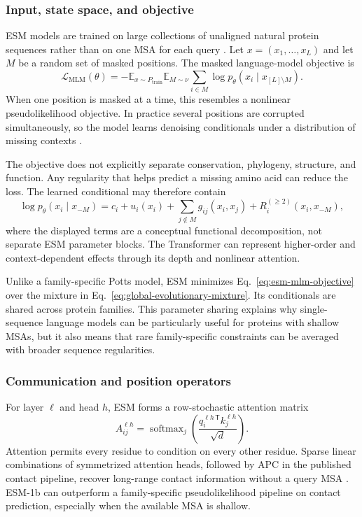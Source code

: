 \documentclass[10pt]{article}
\newcommand{\E}{\mathbb E}
\begin{document}
\subsubsection{Input, state space, and objective}

ESM models are trained on large collections of unaligned natural protein sequences rather than on
one MSA for each query \cite{rives2021}.  Let $x=(x_1,\ldots,x_L)$ and let $M$ be a random set of
masked positions.  The masked language-model objective is
\begin{equation}
\mathcal L_{\mathrm{MLM}}(\theta)
=-\E_{x\sim P_{\mathrm{train}}}
\E_{M\sim\nu}
\sum_{i\in M}
\log p_{\theta}(x_i\mid x_{[L]\setminus M}).
\label{eq:esm-mlm-objective}
\end{equation}
When one position is masked at a time, this resembles a nonlinear pseudolikelihood objective.  In
practice several positions are corrupted simultaneously, so the model learns denoising
conditionals under a distribution of missing contexts \cite{rao2020}.

The objective does not explicitly separate conservation, phylogeny, structure, and function.  Any
regularity that helps predict a missing amino acid can reduce the loss.  The learned conditional
may therefore contain
\begin{equation}
\log p_{\theta}(x_i\mid x_{-M})
=c_i+u_i(x_i)+
\sum_{j\notin M}g_{ij}(x_i,x_j)
+R_i^{(\geq2)}(x_i,x_{-M}),
\label{eq:esm-conditional-decomposition}
\end{equation}
where the displayed terms are a conceptual functional decomposition, not separate ESM parameter
blocks.  The Transformer can represent higher-order and context-dependent effects through its
depth and nonlinear attention.

Unlike a family-specific Potts model, ESM minimizes Eq.~\ref{eq:esm-mlm-objective} over the mixture
in Eq.~\ref{eq:global-evolutionary-mixture}.  Its conditionals are shared across protein families.
This parameter sharing explains why single-sequence language models can be particularly useful for
proteins with shallow MSAs, but it also means that rare family-specific constraints can be averaged
with broader sequence regularities.

\subsubsection{Communication and position operators}

For layer $\ell$ and head $h$, ESM forms a row-stochastic attention matrix
\begin{equation}
A_{ij}^{\ell h}
=\operatorname{softmax}_{j}
\left(
\frac{q_i^{\ell h\,\mathsf T}k_j^{\ell h}}
{\sqrt d}
\right).
\label{eq:esm-attention}
\end{equation}
Attention permits every residue to condition on every other residue.  Sparse linear combinations
of symmetrized attention heads, followed by APC in the published contact pipeline, recover
long-range contact information without a query MSA \cite{rao2020}.  ESM-1b can outperform a
family-specific pseudolikelihood pipeline on contact prediction, especially when the available MSA
is shallow.
\end{document}
